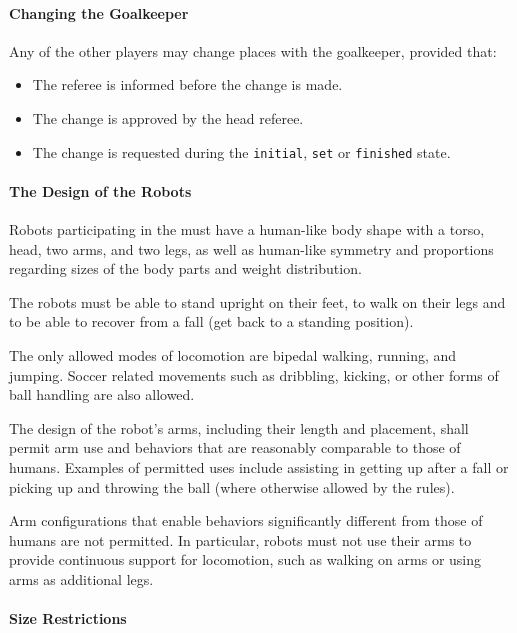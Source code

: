 \paragraph{Changing the Goalkeeper}

Any of the other players may change places with the goalkeeper, provided that:
\begin{itemize}
  \item The referee is informed before the change is made.
  \item The change is approved by the head referee.
  \item The change is requested during the \texttt{initial}, \texttt{set} or \texttt{finished} state.
\end{itemize}

\label{sec:robot_players}

\paragraph{The Design of the Robots}
\label{sec:design_of_robots}
Robots participating in the \leaguenameabbr must have a human-like body shape with a torso, head, two arms, and two legs, as well as human-like symmetry and proportions regarding sizes of the body parts and weight distribution.

The robots must be able to stand upright on their feet, to walk on their legs and to be able to recover from a fall (get back to a standing position). 

The only allowed modes of locomotion are bipedal walking, running, and jumping. Soccer related movements such as dribbling, kicking, or other forms of ball handling are also allowed.

The design of the robot's arms, including their length and placement, shall permit arm use and behaviors that are reasonably comparable to those of humans. Examples of permitted uses include assisting in getting up after a fall or picking up and throwing the ball (where otherwise allowed by the rules).

Arm configurations that enable behaviors significantly different from those of humans are not permitted. In particular, 
robots must not use their arms to provide continuous support for locomotion, such as walking on arms or using arms as additional legs.

\paragraph{Size Restrictions}

